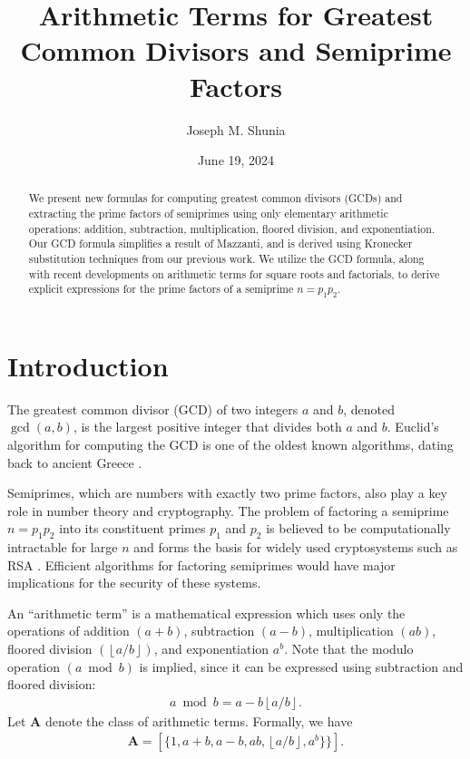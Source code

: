 \documentclass[11pt,reqno]{article}
\title{Arithmetic Terms for Greatest Common Divisors and Semiprime Factors}
\author{Joseph M. Shunia}
\date{June 19, 2024}
\theoremstyle{plain}
\theoremstyle{definition}
\newcommand{\floor}[1]{\left\lfloor #1 \right\rfloor}
\begin{document}
\maketitle

\begin{abstract}
We present new formulas for computing greatest common divisors (GCDs) and extracting the prime factors of semiprimes using only elementary arithmetic operations: addition, subtraction, multiplication, floored division, and exponentiation. Our GCD formula simplifies a result of Mazzanti, and is derived using Kronecker substitution techniques from our previous work. We utilize the GCD formula, along with recent developments on arithmetic terms for square roots and factorials, to derive explicit expressions for the prime factors of a semiprime $n=p_1p_2$.
\end{abstract}

\section{Introduction}

The greatest common divisor (GCD) of two integers $a$ and $b$, denoted $\gcd(a,b)$, is the largest positive integer that divides both $a$ and $b$. Euclid's algorithm for computing the GCD is one of the oldest known algorithms, dating back to ancient Greece \cite{knuth1997art}.

Semiprimes, which are numbers with exactly two prime factors, also play a key role in number theory and cryptography. The problem of factoring a semiprime $n=p_1 p_2$ into its constituent primes $p_1$ and $p_2$ is believed to be computationally intractable for large $n$ and forms the basis for widely used cryptosystems such as RSA \cite{rivest1978rsa}. Efficient algorithms for factoring semiprimes would have major implications for the security of these systems.

An ``arithmetic term'' is a mathematical expression which uses only the operations of addition $(a+b)$, subtraction $(a-b)$, multiplication $(ab)$, floored division $(\floor{a/b})$, and exponentiation $a^b$. Note that the modulo operation $(a \bmod b)$ is implied, since it can be expressed using subtraction and floored division:
\begin{align*}
    a \bmod b = a - b \floor{a/b} .
\end{align*}
Let $\textbf{A}$ denote the class of arithmetic terms. Formally, we have
\begin{align*}
\textbf{A} = [ \{ 1, a+b, a-b, ab, \floor{a/b}, a^b \} \} ].
\end{align*}
\end{document}
